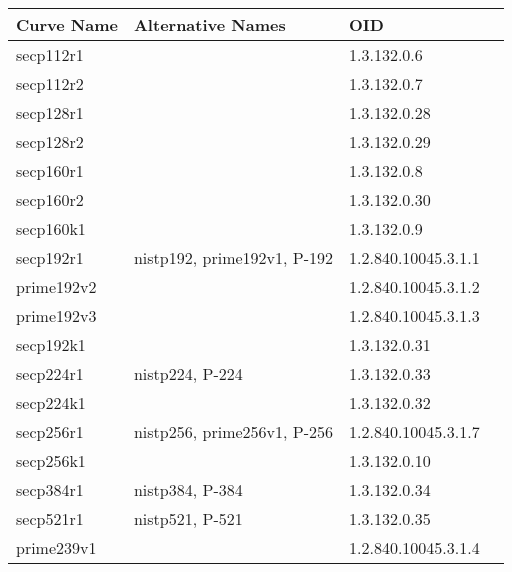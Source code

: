 \documentclass[synpaper]{book}
\begin{document}
\begin{table}[H]
\begin{center}
\begin{tabular}{|l|l|l|l|}
      \hline \textbf{Curve Name} & \textbf{Alternative Names}  & \textbf{OID}          \\
      \hline secp112r1           &                             & 1.3.132.0.6           \\
      \hline secp112r2           &                             & 1.3.132.0.7           \\
      \hline secp128r1           &                             & 1.3.132.0.28          \\
      \hline secp128r2           &                             & 1.3.132.0.29          \\
      \hline secp160r1           &                             & 1.3.132.0.8           \\
      \hline secp160r2           &                             & 1.3.132.0.30          \\
      \hline secp160k1           &                             & 1.3.132.0.9           \\
      \hline secp192r1           & nistp192, prime192v1, P-192 & 1.2.840.10045.3.1.1   \\
      \hline prime192v2          &                             & 1.2.840.10045.3.1.2   \\
      \hline prime192v3          &                             & 1.2.840.10045.3.1.3   \\
      \hline secp192k1           &                             & 1.3.132.0.31          \\
      \hline secp224r1           & nistp224, P-224             & 1.3.132.0.33          \\
      \hline secp224k1           &                             & 1.3.132.0.32          \\
      \hline secp256r1           & nistp256, prime256v1, P-256 & 1.2.840.10045.3.1.7   \\
      \hline secp256k1           &                             & 1.3.132.0.10          \\
      \hline secp384r1           & nistp384, P-384             & 1.3.132.0.34          \\
      \hline secp521r1           & nistp521, P-521             & 1.3.132.0.35          \\
      \hline prime239v1          &                             & 1.2.840.10045.3.1.4   \\

\end{tabular}
\end{center}
\end{table}
\end{document}
